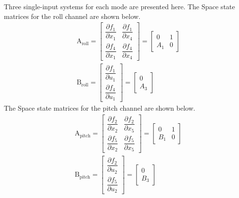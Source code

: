 \documentclass[conference]{IEEEtran}
\begin{document}

Three single-input systems for each mode are presented here. The Space state matrices for the roll channel are shown below.
\begin{equation}
	\begin{split}
		&\boldsymbol{\mathrm{A}}_{\text{roll}} = \begin{bmatrix}
			\dfrac{\partial  f_1}{\partial  x_1}& \dfrac{\partial  f_1}{\partial  x_4}
			\\[1em]
			\dfrac{\partial  f_4}{\partial  x_1}& \dfrac{\partial  f_4}{\partial  x_4}
		\end{bmatrix} = 
		\begin{bmatrix}
			0 & 1\\
			A_1 & 0
		\end{bmatrix} \\[1em]
		&\boldsymbol{\mathrm{B}}_{\text{roll}}  = \begin{bmatrix}
			\dfrac{\partial  f_1}{\partial  u_1}
			\\[1em]
			\dfrac{\partial  f_4}{\partial  u_1}
		\end{bmatrix} = 
		\begin{bmatrix}
			0\\
			A_3
		\end{bmatrix}
	\end{split}
\end{equation}
The Space state matrices for the pitch channel are shown below.
\begin{equation}
	\begin{split}
		&\boldsymbol{\mathrm{A}}_{\text{pitch}}  = \begin{bmatrix}
			\dfrac{\partial  f_2}{\partial  x_2}& \dfrac{\partial  f_2}{\partial  x_5}
			\\[1em]
			\dfrac{\partial  f_5}{\partial  x_2}& \dfrac{\partial  f_5}{\partial  x_5}
		\end{bmatrix} = 
		\begin{bmatrix}
			0 & 1\\
			B_1 & 0
		\end{bmatrix}\\[1em]
		&\boldsymbol{\mathrm{B}}_{\text{pitch}}  = \begin{bmatrix}
			\dfrac{\partial  f_2}{\partial  u_2}
			\\[1em]
			\dfrac{\partial  f_5}{\partial  u_2}
		\end{bmatrix} = 
		\begin{bmatrix}
			0\\
			B_3
		\end{bmatrix}
	\end{split}
\end{equation}
\end{document}
